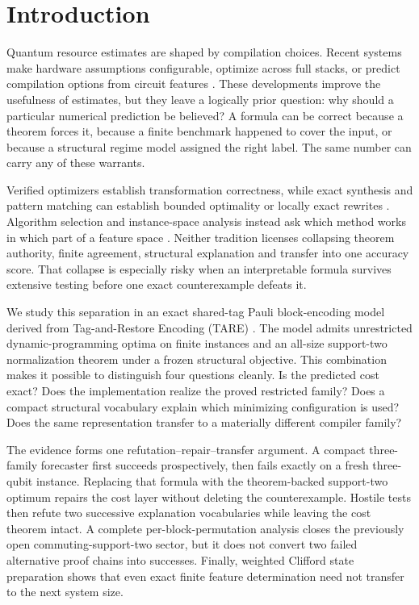 \section{Introduction}

Quantum resource estimates are shaped by compilation choices.  Recent systems make hardware assumptions configurable, optimize across full stacks, or predict compilation options from circuit features \cite{campbell2026resourceestimation,autoqureo2026,quetschlich2023options,quetschlich2025predictor}.  These developments improve the usefulness of estimates, but they leave a logically prior question: why should a particular numerical prediction be believed?  A formula can be correct because a theorem forces it, because a finite benchmark happened to cover the input, or because a structural regime model assigned the right label.  The same number can carry any of these warrants.

Verified optimizers establish transformation correctness, while exact synthesis and pattern matching can establish bounded optimality or locally exact rewrites \cite{hietala2021verified,li2022oracles,iten2022patterns,bravyi2022clifford}.  Algorithm selection and instance-space analysis instead ask which method works in which part of a feature space \cite{rice1976algorithm,smithmiles2009meta,smithmiles2023isa}.  Neither tradition licenses collapsing theorem authority, finite agreement, structural explanation and transfer into one accuracy score.  That collapse is especially risky when an interpretable formula survives extensive testing before one exact counterexample defeats it.

We study this separation in an exact shared-tag Pauli block-encoding model derived from Tag-and-Restore Encoding (TARE) \cite{schillo2026tare}.  The model admits unrestricted dynamic-programming optima on finite instances and an all-size support-two normalization theorem under a frozen structural objective.  This combination makes it possible to distinguish four questions cleanly.  Is the predicted cost exact?  Does the implementation realize the proved restricted family?  Does a compact structural vocabulary explain which minimizing configuration is used?  Does the same representation transfer to a materially different compiler family?

The evidence forms one refutation--repair--transfer argument.  A compact three-family forecaster first succeeds prospectively, then fails exactly on a fresh three-qubit instance.  Replacing that formula with the theorem-backed support-two optimum repairs the cost layer without deleting the counterexample.  Hostile tests then refute two successive explanation vocabularies while leaving the cost theorem intact.  A complete per-block-permutation analysis closes the previously open commuting-support-two sector, but it does not convert two failed alternative proof chains into successes.  Finally, weighted Clifford state preparation shows that even exact finite feature determination need not transfer to the next system size.


